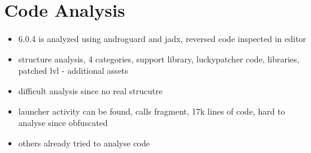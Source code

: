 \section{Code Analysis} \label{section:luckypatcher-analysis}
\begin{itemize}
    \item 6.0.4 is analyzed using androguard and jadx, reversed code inspected in editor
    \item structure analysis, 4 categories, support library, luckypatcher code, libraries, patched lvl - additional assets
    \item difficult analysis since no real strucutre
    \item launcher activity can be found, calls fragment, 17k lines of code, hard to analyse since obfuscated
    \item others already tried to analyse code
\end{itemize}

